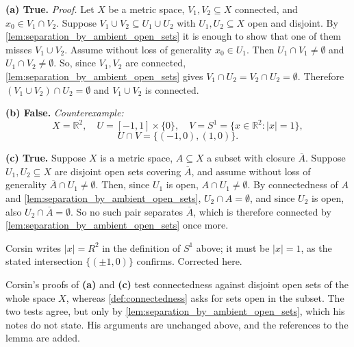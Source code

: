 \begin{exercisesolution}
\textbf{(a) True.} \textit{Proof.} Let $X$ be a metric space, $V_1, V_2 \subseteq X$ connected,
and $x_0 \in V_1 \cap V_2$. Suppose $V_1 \cup V_2 \subseteq U_1 \cup U_2$ with
$U_1, U_2 \subseteq X$ open and disjoint. By \cref{lem:separation_by_ambient_open_sets} it is
enough to show that one of them misses $V_1 \cup V_2$. Assume without loss of generality
$x_0 \in U_1$. Then $U_1 \cap V_1 \neq \emptyset$ and $U_1 \cap V_2 \neq \emptyset$. So, since
$V_1, V_2$ are connected, \cref{lem:separation_by_ambient_open_sets} gives
$V_1 \cap U_2 = V_2 \cap U_2 = \emptyset$. Therefore $(V_1 \cup V_2) \cap U_2 = \emptyset$ and
$V_1 \cup V_2$ is connected.

\textbf{(b) False.} \textit{Counterexample:}
\[
X = \mathbb{R}^2, \quad U = [-1,1] \times \{0\}, \quad V = S^1 = \{x \in \mathbb{R}^2 : |x| = 1\},
\]
\[
U \cap V = \{(-1,0), (1,0)\}.
\]

\textbf{(c) True.} Suppose $X$ is a metric space, $A \subseteq X$ a subset with closure
$\overline{A}$. Suppose $U_1, U_2 \subseteq X$ are disjoint open sets covering $\overline{A}$, and
assume without loss of generality $\overline{A} \cap U_1 \neq \emptyset$. Then, since $U_1$ is
open, $A \cap U_1 \neq \emptyset$. By connectedness of $A$ and
\cref{lem:separation_by_ambient_open_sets}, $U_2 \cap A = \emptyset$, and since $U_2$ is open,
also $U_2 \cap \overline{A} = \emptyset$. So no such pair separates $\overline{A}$, which is
therefore connected by \cref{lem:separation_by_ambient_open_sets} once more.
\end{exercisesolution}

\begin{ainote}
Corsin writes $|x| = R^2$ in the definition of $S^1$ above; it must be $|x| = 1$, as the
stated intersection $\{(\pm 1, 0)\}$ confirms. Corrected here.
\end{ainote}

\begin{ainote}
Corsin's proofs of \textbf{(a)} and \textbf{(c)} test connectedness against disjoint open sets of
the whole space $X$, whereas \cref{def:connectedness} asks for sets open in the subset. The two
tests agree, but only by \cref{lem:separation_by_ambient_open_sets}, which his notes do not
state. His arguments are unchanged above, and the references to the lemma are added.
\end{ainote}

